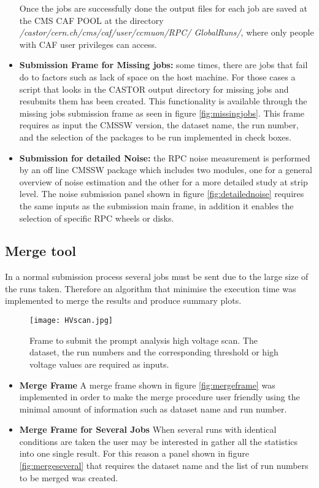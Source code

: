 \documentclass[11pt]{amsart}
\begin{document}
\begin{itemize}
\begin{itemize}
\end{itemize}
Once the jobs are successfully done the output files for each job are saved at the CMS CAF POOL at the directory \textit{/castor/cern.ch/cms/caf/user/ccmuon/RPC/ GlobalRuns/}, where only people with CAF user privileges can access. \\
\item\textbf{Submission Frame for Missing jobs:}
some times, there are jobs that fail do to factors such as lack of space on the host machine. For those cases a script  that looks in the CASTOR output directory for missing jobs and resubmits them has been created. This functionality is available through the missing jobs submission frame as seen in figure \ref{fig:missingjobs}.  This frame requires as input the CMSSW version, the dataset name, the run number, and the selection of the packages to be run implemented in check boxes.\\

\item\textbf{Submission for detailed Noise:}
the RPC noise measurement is performed by an off line CMSSW package which includes two modules, one for a general overview of  noise estimation and the other for a more detailed study at strip level. The noise submission panel shown in figure \ref{fig:detailednoise} requires the same inputs as the submission main frame, in addition it enables the selection of specific RPC wheels or disks. 
\end{itemize}
\subsection{Merge tool}
In a normal submission process several jobs must be sent due to the large size of the runs taken. Therefore an algorithm that minimise the execution time  was implemented to merge the results and produce summary plots. \\
\begin{figure}[htb] %
   \centering
   \texttt{[image: HVscan.jpg]} 
   \caption{Frame to submit the prompt analysis high voltage scan. The dataset, the run numbers and the corresponding threshold or high voltage values are required as inputs. }
   \label{fig:hv}
\end{figure}
\begin{itemize}
\item \textbf{Merge Frame}
A merge frame shown in figure \ref{fig:mergeframe} was implemented in order to make the merge procedure user friendly using the minimal amount of information such as dataset name and run number.\\
\item \textbf{Merge Frame for Several Jobs}
When several runs with identical conditions are taken the user may be interested in gather all the statistics into one single result. For this reason a panel shown in figure \ref{fig:mergeseveral} that requires the dataset name and the list of run numbers to be merged was created.\\
\end{itemize}
\end{document}
